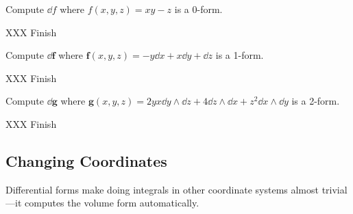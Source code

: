 \begin{example}
	Compute $\dd f$ where $f(x,y,z) = xy-z$ is a 0-form.

	XXX Finish
\end{example}
\begin{example}
	Compute $\dd \bm f$ where $\bm f(x,y,z) = -y\dd x+x\dd y +\dd z$ is a 1-form.

	XXX Finish
\end{example}
\begin{example}
	Compute $\dd \bm g$ where $\bm g(x,y,z) = 2yx\dd y\wedge \dd z
	+ 4\dd z\wedge \dd x+z^2\dd x\wedge \dd y$ is a 2-form.

	XXX Finish
\end{example}

\subsection{Changing Coordinates}

Differential forms make doing integrals in other coordinate systems
almost trivial---it computes the volume form automatically.

